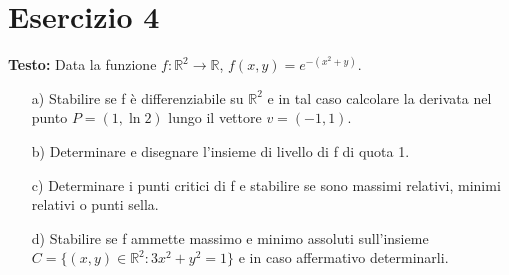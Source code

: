 \documentclass[12pt, a4paper]{article}
\begin{document}
\newpage

\section*{Esercizio 4}

\textbf{Testo:} Data la funzione $f: \mathbb{R}^{2} \rightarrow \mathbb{R}$, $f(x,y) = e^{-(x^{2}+y)}$.
\begin{enumerate}
    \item[a)] Stabilire se f è differenziabile su $\mathbb{R}^{2}$ e in tal caso calcolare la derivata nel punto $P=(1, \ln 2)$ lungo il vettore $v=(-1,1)$.
    \item[b)] Determinare e disegnare l'insieme di livello di f di quota 1.
    \item[c)] Determinare i punti critici di f e stabilire se sono massimi relativi, minimi relativi o punti sella.
    \item[d)] Stabilire se f ammette massimo e minimo assoluti sull'insieme $C = \{(x,y) \in \mathbb{R}^{2} : 3x^{2}+y^{2}=1\}$ e in caso affermativo determinarli.
\end{enumerate}
\end{document}
